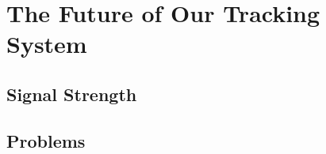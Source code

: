 \section{The Future of Our Tracking System}\label{sec:future_system}

\subsection*{Signal Strength}

\subsection*{Problems}
